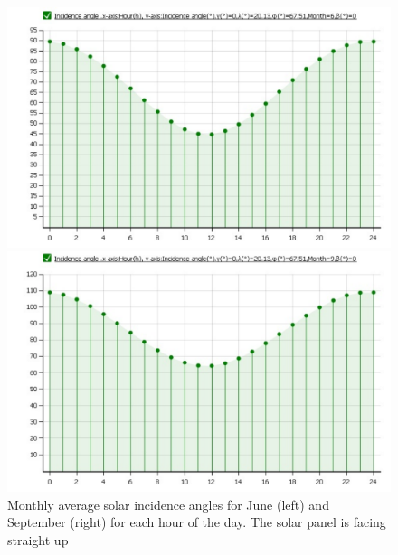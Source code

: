 \begin{figure}[H]
\centering
\begin{minipage}[t]{0.48\linewidth}
\includegraphics[width=\textwidth]{figures/fig_CDR_EPS_SolarIncidenceAngle_Jun}
\end{minipage}
\begin{minipage}[t]{0.48\linewidth}
\centering
\includegraphics[width=\textwidth]{figures/fig_CDR_EPS_SolarIncidenceAngle_Sep}
\end{minipage}
\caption[Solar incidence angles]{Monthly average solar incidence angles for June (left) and September (right) for each hour of the day. The solar panel is facing straight up}
\label{fig:SolarIncidenceAngles}
\end{figure}
%
